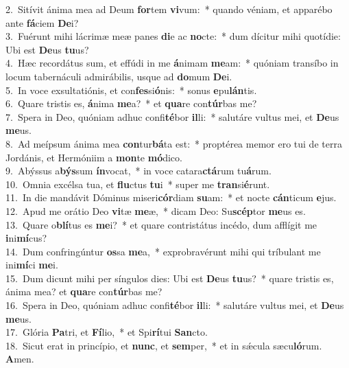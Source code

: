 {2.~}Sitívit ánima mea ad Deum \textbf{for}tem \textbf{vi}vum:~* quando véniam, et apparébo ante \textbf{fá}ciem \textbf{De}i?\\
{3.~}Fuérunt mihi lácrimæ meæ panes \textbf{di}e ac \textbf{no}cte:~* dum dícitur mihi quotídie: Ubi est \textbf{De}us \textbf{tu}us?\\
{4.~}Hæc recordátus sum, et effúdi in me \textbf{á}nimam \textbf{me}am:~* quóniam transíbo in locum tabernáculi admirábilis, usque ad \textbf{do}mum \textbf{De}i.\\
{5.~}In voce exsultatiónis, et con\textbf{fes}si\textbf{ó}nis:~* sonus \textbf{e}pu\textbf{lán}tis.\\
{6.~}Quare tristis es, \textbf{á}nima \textbf{me}a?~* et \textbf{qua}re con\textbf{túr}bas me?\\
{7.~}Spera in Deo, quóniam adhuc confi\textbf{té}bor \textbf{il}li:~* salutáre vultus mei, et \textbf{De}us \textbf{me}us.\\
{8.~}Ad meípsum ánima mea \textbf{con}tur\textbf{bá}ta est:~* proptérea memor ero tui de terra Jordánis, et Hermóniim a \textbf{mon}te \textbf{mó}dico.\\
{9.~}Abýssus a\textbf{býs}sum \textbf{ín}vocat,~* in voce catara\textbf{ctá}rum tu\textbf{á}rum.\\
{10.~}Omnia excélsa tua, et \textbf{flu}ctus \textbf{tu}i~* super me \textbf{tran}si\textbf{é}runt.\\
{11.~}In die mandávit Dóminus miseri\textbf{cór}diam \textbf{su}am:~* et nocte \textbf{cán}ticum \textbf{e}jus.\\
{12.~}Apud me orátio Deo \textbf{vi}tæ \textbf{me}æ,~* dicam Deo: Su\textbf{scép}tor \textbf{me}us es.\\
{13.~}Quare o\textbf{blí}tus es \textbf{me}i?~* et quare contristátus incédo, dum afflígit me \textbf{i}ni\textbf{mí}cus?\\
{14.~}Dum confringúntur \textbf{os}sa \textbf{me}a,~* exprobravérunt mihi qui tríbulant me ini\textbf{mí}ci \textbf{me}i.\\
{15.~}Dum dicunt mihi per síngulos dies: Ubi est \textbf{De}us \textbf{tu}us?~* quare tristis es, ánima mea? et \textbf{qua}re con\textbf{túr}bas me?\\
{16.~}Spera in Deo, quóniam adhuc confi\textbf{té}bor \textbf{il}li:~* salutáre vultus mei, et \textbf{De}us \textbf{me}us.\\
{17.~}Glória \textbf{Pa}tri, et \textbf{Fí}lio,~* et Spi\textbf{rí}tui \textbf{San}cto.\\
{18.~}Sicut erat in princípio, et \textbf{nunc}, et \textbf{sem}per,~* et in sǽcula sæcu\textbf{ló}rum. \textbf{A}men.\\

